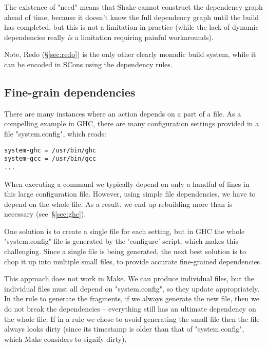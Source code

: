 The existence of \lst"need" means that Shake cannot construct the
dependency graph ahead of time, because it doesn't know the full
dependency graph until the build has completed, but this is not a
limitation in practice (while the lack of dynamic dependencies really
\emph{is} a limitation requiring painful workarounds).


Note, Redo (\S\ref{sec:redo}) is the only other clearly monadic build
system, while it can be encoded in SCons using the dependency rules.

\subsection{Fine-grain dependencies\label{sec:fine-grain-deps}}

There are many instances where an action depends on a part of a file. As a
compelling example in GHC, there are many configuration settings provided in a
file \lst"system.config", which reads:

\begin{lstlisting}
system-ghc = /usr/bin/ghc
system-gcc = /usr/bin/gcc
...
\end{lstlisting}

\vspace{-2mm}
When executing a command we typically depend on only a handful of lines in this
large configuration file. However, using simple file dependencies, we have to
depend on the whole file. As a result, we end up rebuilding more than is
necessary (see~\S\ref{sec:ghc}).

One solution is to create a single file for each setting, but in GHC the whole
\lst"system.config" file is generated by the \lst'configure' script, which makes
this challenging. Since a single file is being generated, the next best solution
is to chop it up into multiple small files, to provide accurate fine-grained
dependencies.

This approach does not work in Make. We can produce individual
files, but the individual files must all depend on \lst"system.config", so they
update appropriately. In the rule to generate the fragments, if we always generate the
new file, then we do not break the dependencies -- everything still has an
ultimate dependency on the whole file. If in a rule we chose to avoid generating
the small file then the file always looks dirty (since its timestamp is older
than that of \lst"system.config", which Make considers to signify dirty).

